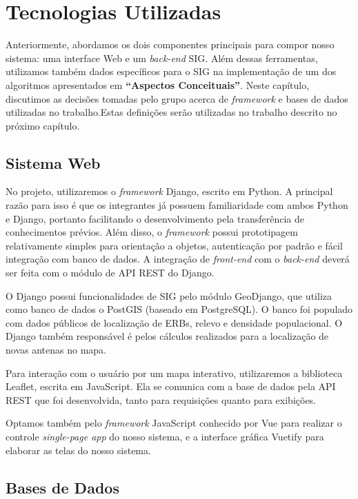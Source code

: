 \documentclass[]{politex}
\newcommand*\NewPage{\newpage\null\thispagestyle{empty}\newpage}
\begin{document}
\NewPage
\chapter{Tecnologias Utilizadas}

Anteriormente, abordamos os dois componentes principais para compor nosso
sistema: uma interface Web e um \textit{back-end} SIG. Além dessas ferramentas,
utilizamos também dados específicos para o SIG na implementação de um dos
algoritmos apresentados em \textbf{``Aspectos Conceituais''}. Neste capítulo,
discutimos as decisões tomadas pelo grupo acerca de \textit{framework} e bases de
dados utilizadas no trabalho.Estas definições serão utilizadas no trabalho
descrito no próximo capítulo.

\section{Sistema Web}

No projeto, utilizaremos o \textit{framework} Django, escrito em Python. A
principal razão para isso é que os integrantes já possuem familiaridade com
ambos Python e Django, portanto facilitando o desenvolvimento pela transferência
de conhecimentos prévios. Além disso, o \textit{framework} possui prototipagem
relativamente simples para orientação a objetos, autenticação por padrão e fácil
integração com banco de dados. A integração de \textit{front-end} com o
\textit{back-end} deverá ser feita com o módulo de API REST do Django.

O Django possui funcionalidades de SIG pelo módulo GeoDjango, que utiliza como
banco de dados o PostGIS (baseado em PostgreSQL). O banco foi populado com dados
públicos de localização de ERBs, relevo e densidade populacional. O Django
também responsável é pelos cálculos realizados para a localização de novas
antenas no mapa.

Para interação com o usuário por um mapa interativo, utilizaremos a biblioteca
Leaflet, escrita em JavaScript. Ela se comunica com a base de dados pela API
REST que foi desenvolvida, tanto para requisições quanto para exibições.

Optamos também pelo \textit{framework} JavaScript conhecido por Vue para
realizar o controle \textit{single-page app} do nosso sistema, e a interface
gráfica Vuetify para elaborar as telas do nosso sistema.

\section{Bases de Dados}
\end{document}
